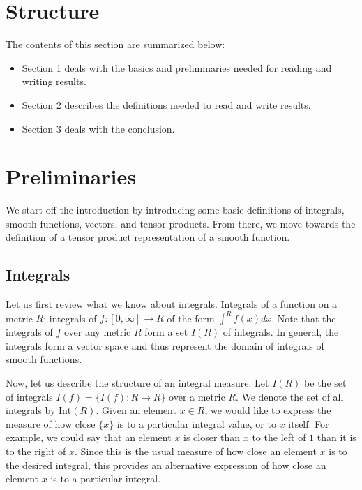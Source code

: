 \documentclass[a4paper,reqno,oneside]{article}
\begin{document}
\section*{Structure} %
The contents of this section are summarized below:
\begin{itemize}
    \item Section 1 deals with the basics and preliminaries needed for reading and writing results.
    \item Section 2 describes the definitions needed to read and write results.
    \item Section 3 deals with the conclusion.
\end{itemize}



\section{Preliminaries} %
We start off the introduction by introducing some basic definitions of integrals, smooth functions, vectors, and tensor products. From there, we move towards the definition of a tensor product representation of a smooth function.

\subsection{Integrals} %
Let us first review what we know about integrals. Integrals of a function on a metric $R$: integrals of $f: [0,\infty]\to R$ of the form $\int^R f(x) dx$. Note that the integrals of $f$ over any metric $R$ form a set $I(R)$ of integrals. In general, the integrals form a vector space and thus represent the domain of integrals of smooth functions.

Now, let us describe the structure of an integral measure. Let $I(R)$ be the set of integrals $I(f) = \{ I(f): R \to R\}$ over a metric $R$. We denote the set of all integrals by $\mathrm{Int}(R)$. Given an element $x\in R$, we would like to express the measure of how close $\{x\}$ is to a particular integral value, or to $x$ itself. For example, we could say that an element $x$ is closer than $x$ to the left of $1$ than it is to the right of $x$. Since this is the usual measure of how close an element $x$ is to the desired integral, this provides an alternative expression of how close an element $x$ is to a particular integral.
\end{document}
